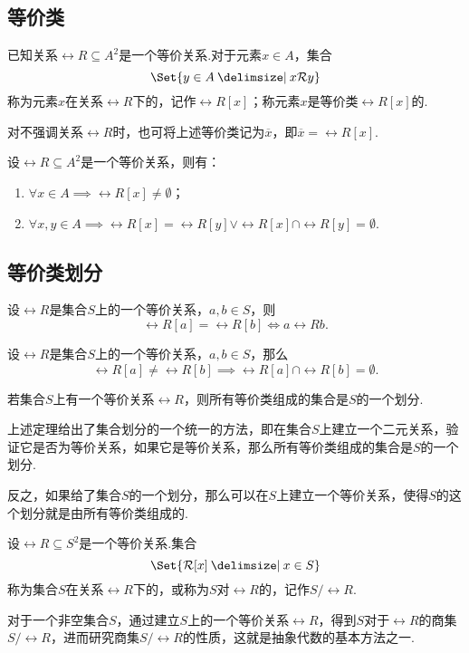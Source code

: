 \subsection{等价类}
\begin{definition}
\def\R{\rel{R}}
已知关系\(\R \subseteq A^2\)是一个等价关系.对于元素\(x \in A\)，集合\[
\Set{y \in A \given x \R y}
\]称为元素\(x\)在关系\(\R\)下的，记作\(\R[x]\)；称元素\(x\)是等价类\(\R[x]\)的.

对不强调关系\(\R\)时，也可将上述等价类记为\(\overline{x}\)，即\(\overline{x} = \R[x]\).
\end{definition}

\begin{property}
\def\R{\rel{R}}
设\(\R \subseteq A^2\)是一个等价关系，则有：
\begin{enumerate}
 \item \(\forall x \in A \implies \R[x] \neq \emptyset\)；
 \item \(\forall x,y \in A \implies \R[x] = \R[y] \lor \R[x] \cap \R[y] = \emptyset\).
\end{enumerate}
\end{property}

\subsection{等价类划分}
\begin{lemma}
设\(\rel{R}\)是集合\(S\)上的一个等价关系，\(a,b \in S\)，则\[
\rel{R}[a] = \rel{R}[b] \iff a \rel{R} b.
\]
\end{lemma}

\begin{lemma}
设\(\rel{R}\)是集合\(S\)上的一个等价关系，\(a,b \in S\)，那么\[
\rel{R}[a] \neq \rel{R}[b] \implies \rel{R}[a] \cap \rel{R}[b] = \emptyset.
\]
\end{lemma}

\begin{theorem}
若集合\(S\)上有一个等价关系\(\rel{R}\)，则所有等价类组成的集合是\(S\)的一个划分.
\end{theorem}
上述定理给出了集合划分的一个统一的方法，即在集合\(S\)上建立一个二元关系，验证它是否为等价关系，如果它是等价关系，那么所有等价类组成的集合是\(S\)的一个划分.

反之，如果给了集合\(S\)的一个划分，那么可以在\(S\)上建立一个等价关系，使得\(S\)的这个划分就是由所有等价类组成的.

\begin{definition}
设\(\rel{R} \subseteq S^2\)是一个等价关系.集合\[
\Set{\rel{R}[x] \given x \in S}
\]称为集合\(S\)在关系\(\rel{R}\)下的，或称为\(S\)对\(\rel{R}\)的，记作\(S/\rel{R}\).
\end{definition}
对于一个非空集合\(S\)，通过建立\(S\)上的一个等价关系\(\rel{R}\)，得到\(S\)对于\(\rel{R}\)的商集\(S/\rel{R}\)，进而研究商集\(S/\rel{R}\)的性质，这就是抽象代数的基本方法之一.

